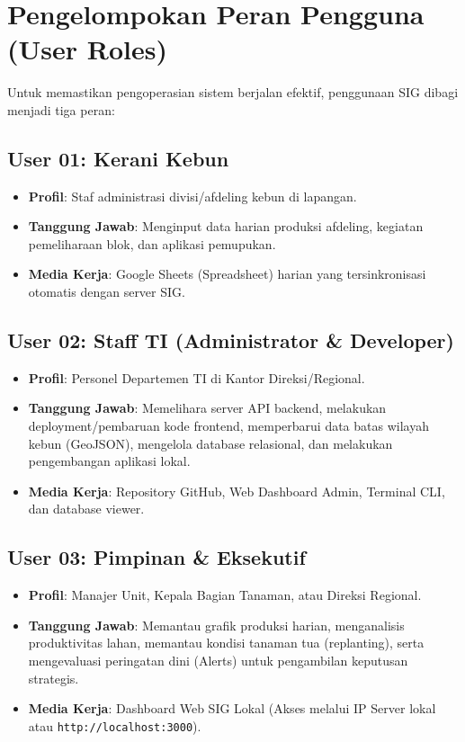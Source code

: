 \documentclass[12pt, a4paper]{article}
\begin{document}
\newpage

\section{Pengelompokan Peran Pengguna (User Roles)}
Untuk memastikan pengoperasian sistem berjalan efektif, penggunaan SIG dibagi menjadi tiga peran:

\subsection{User 01: Kerani Kebun}
\begin{itemize}
    \item \textbf{Profil}: Staf administrasi divisi/afdeling kebun di lapangan.
    \item \textbf{Tanggung Jawab}: Menginput data harian produksi afdeling, kegiatan pemeliharaan blok, dan aplikasi pemupukan.
    \item \textbf{Media Kerja}: Google Sheets (Spreadsheet) harian yang tersinkronisasi otomatis dengan server SIG.
\end{itemize}

\subsection{User 02: Staff TI (Administrator & Developer)}
\begin{itemize}
    \item \textbf{Profil}: Personel Departemen TI di Kantor Direksi/Regional.
    \item \textbf{Tanggung Jawab}: Memelihara server API backend, melakukan deployment/pembaruan kode frontend, memperbarui data batas wilayah kebun (GeoJSON), mengelola database relasional, dan melakukan pengembangan aplikasi lokal.
    \item \textbf{Media Kerja}: Repository GitHub, Web Dashboard Admin, Terminal CLI, dan database viewer.
\end{itemize}

\subsection{User 03: Pimpinan \& Eksekutif}
\begin{itemize}
    \item \textbf{Profil}: Manajer Unit, Kepala Bagian Tanaman, atau Direksi Regional.
    \item \textbf{Tanggung Jawab}: Memantau grafik produksi harian, menganalisis produktivitas lahan, memantau kondisi tanaman tua (replanting), serta mengevaluasi peringatan dini (Alerts) untuk pengambilan keputusan strategis.
    \item \textbf{Media Kerja}: Dashboard Web SIG Lokal (Akses melalui IP Server lokal atau \texttt{http://localhost:3000}).
\end{itemize}
\end{document}
